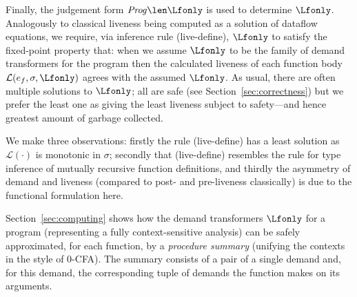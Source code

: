 \documentclass{llncs}
\begin{document}
Finally, the judgement form $\mathit{Prog} \len \Lfonly$ is used to determine $\Lfonly$\@.
Analogously to classical liveness being computed as
a solution of dataflow equations, we require, via inference rule ({\sc live-define}),
$\Lfonly$ to satisfy the fixed-point property that:
 when we assume $\Lfonly$ to be the family of demand transformers for the program
 then the calculated liveness of each function body $\mathcal{L}(e_f,\sigma,\Lfonly)$ agrees
 with the assumed  $\Lfonly$.
As usual, there are often multiple solutions to $\Lfonly$; all are safe
(see Section~\ref{sec:correctness})
but we prefer the least one as giving the least liveness subject to safety---and
hence greatest amount of garbage collected.

We make three observations: firstly the rule ({\sc live-define}) has a least solution
as $\mathcal{L}(\cdot)$ is monotonic in $\sigma$; secondly that
({\sc live-define})
resembles the rule for type inference of mutually recursive function definitions,
and thirdly the asymmetry of demand and liveness (compared to post- and pre-liveness
classically) is due to the functional formulation here.

Section~\ref{sec:computing} shows how the demand transformers $\Lfonly$ for a program
(representing a fully context-sensitive analysis)
can be safely approximated, for each function, by a {\em procedure summary}
(unifying the contexts in the style of 0-CFA)\@.
The summary consists of a pair of a single demand and, for this demand,
the corresponding tuple of demands the function makes on its arguments.



\end{document}
